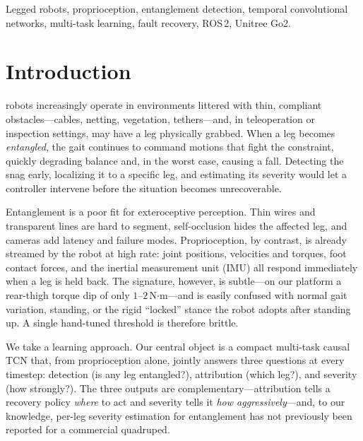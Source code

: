 \documentclass[conference]{IEEEtran}
\begin{document}
\begin{IEEEkeywords}
Legged robots, proprioception, entanglement detection, temporal convolutional
networks, multi-task learning, fault recovery, ROS\,2, Unitree Go2.
\end{IEEEkeywords}

\section{Introduction}
 robots increasingly operate in environments littered
with thin, compliant obstacles---cables, netting, vegetation, tethers---and, in
teleoperation or inspection settings, may have a leg physically grabbed. When a
leg becomes \emph{entangled}, the gait continues to command motions that fight the
constraint, quickly degrading balance and, in the worst case, causing a fall.
Detecting the snag early, localizing it to a specific leg, and estimating its
severity would let a controller intervene before the situation becomes
unrecoverable.

Entanglement is a poor fit for exteroceptive perception. Thin wires and
transparent lines are hard to segment, self-occlusion hides the affected leg, and
cameras add latency and failure modes. Proprioception, by contrast, is already
streamed by the robot at high rate: joint positions, velocities and torques, foot
contact forces, and the inertial measurement unit (IMU) all respond immediately
when a leg is held back. The signature, however, is subtle---on our platform a
rear-thigh torque dip of only $1$--$2$\,N$\cdot$m---and is easily confused with
normal gait variation, standing, or the rigid ``locked'' stance the robot adopts
after standing up. A single hand-tuned threshold is therefore brittle.

We take a learning approach. Our central object is a compact multi-task causal
TCN that, from proprioception alone, jointly answers three questions at every
timestep: detection (is any leg entangled?), attribution (which leg?), and
severity (how strongly?). The three outputs are complementary---attribution tells
a recovery policy \emph{where} to act and severity tells it \emph{how
aggressively}---and, to our knowledge, per-leg severity estimation for
entanglement has not previously been reported for a commercial quadruped.
\end{document}
